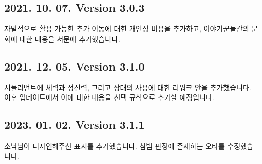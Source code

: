 \documentclass{report}
\begin{document}
	\subsection*{2021. 10. 07. Version 3.0.3}
	자발적으로 활용 가능한 추가 이동에 대한 개연성 비용을 추가하고, 이야기꾼들간의 문화에 대한 내용을 서문에 추가했습니다.

	\subsection*{2021. 12. 05. Version 3.1.0}
	서플리먼트에 체력과 정신력, 그리고 상태의 사용에 대한 리워크 안을 추가했습니다. 이후 업데이트에서 이에 대한 내용을 선택 규칙으로 추가할 예정입니다.
\fi
	\subsection*{2023. 01. 02. Version 3.1.1}
	소낙님이 디자인해주신 표지를 추가했습니다. 침범 판정에 존재하는 오타를 수정했습니다.
\end{document}
